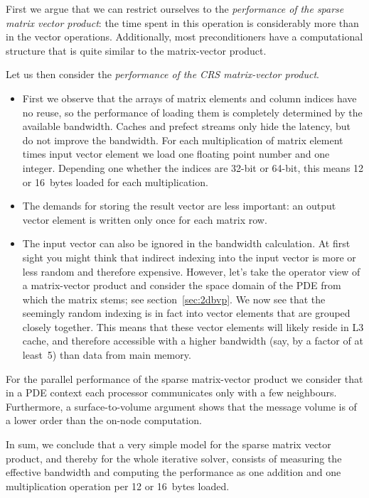 First we argue that we can restrict ourselves to the \emph{performance of the sparse
  matrix vector product}:
the time spent in this operation is considerably more than in the vector operations.
Additionally, most preconditioners have a computational structure that is
quite similar to the matrix-vector product.

Let us then consider the \emph{performance of the CRS matrix-vector
  product}.
\begin{itemize}
\item First we observe that the arrays of matrix elements and column indices have no reuse,
  so the performance of loading them is completely determined by the available bandwidth.
  Caches and prefect streams only hide the latency, but do not improve the bandwidth.
  For
  each multiplication of matrix element times input vector element
  we load one floating point number and one integer. Depending one whether the
  indices are 32-bit or 64-bit, this means 12 or 16~bytes loaded for each multiplication.
\item The demands for storing the result vector are less important: an output vector
  element is written only once for each matrix row.
\item The input vector can also be ignored in the bandwidth calculation.
  At first sight you might think that indirect indexing
  into the input vector is more or less random and therefore expensive.
  However, let's take the operator view of a matrix-vector product
  and consider the space domain of the \ac{PDE} from which the matrix stems;
  see section~\ref{sec:2dbvp}. We now see that the seemingly random indexing
  is in fact into vector elements that are grouped closely together.
  This means that these vector elements will likely reside in L3 cache,
  and therefore accessible with a higher bandwidth (say, by a factor of at least~5)
  than data from main memory.
\end{itemize}
For the parallel performance of the sparse matrix-vector product we
consider that in a \ac{PDE} context each processor communicates only
with a few neighbours. Furthermore, a surface-to-volume argument
shows that the message volume is of a lower order than the on-node
computation.

In sum, we conclude that a very simple model for the sparse matrix vector product,
and thereby for the whole iterative solver, consists of measuring
the effective bandwidth and computing the performance as one
addition and one multiplication operation per 12 or 16~bytes loaded.

